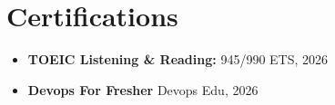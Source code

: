 \documentclass[letterpaper,11pt]{article}
\makeatletter
\newcommand{\resumeItem}[2]{
  \item\small{
    \textbf{#1}{: #2 \vspace{-2pt}}
  }
}
\newcommand{\resumeSubheading}[4]{
  \vspace{-1pt}\item
    \begin{tabular*}{0.97\textwidth}[t]{l@{\extracolsep{\fill}}r}
      \textbf{#1} & #2 \\
      \textit{\small #3} & \textit{\small #4} \\
    \end{tabular*}\vspace{-5pt}
}
\newcommand{\resumeItemPlain}[1]{
  \item\small{
    {#1 \vspace{-4pt}}
  }
}
\newcommand{\resumeSubHeadingListStart}{\begin{itemize}[leftmargin=*]}
\newcommand{\resumeSubHeadingListEnd}{\end{itemize}}
\newcommand{\resumeItemListStart}{\begin{itemize}}
\newcommand{\resumeItemListEnd}{\end{itemize}\vspace{-7pt}}
\makeatother
\begin{document}
\section{Certifications}

  \resumeItemListStart
    \resumeItemPlain{\textbf{TOEIC Listening \& Reading:} 945/990 \hfill ETS, 2026}
    \resumeItemPlain{\textbf{Devops For Fresher} \hfill Devops Edu, 2026}
  \resumeItemListEnd


\end{document}
